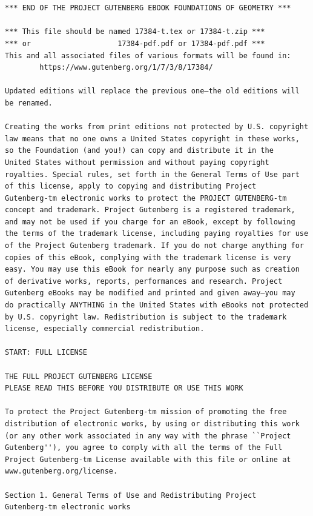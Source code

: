 \documentclass[11pt,oneside]{book}
\begin{document}
\newpage

\small
{}
\begin{verbatim}


*** END OF THE PROJECT GUTENBERG EBOOK FOUNDATIONS OF GEOMETRY ***

*** This file should be named 17384-t.tex or 17384-t.zip ***
*** or                    17384-pdf.pdf or 17384-pdf.pdf ***
This and all associated files of various formats will be found in:
        https://www.gutenberg.org/1/7/3/8/17384/

Updated editions will replace the previous one—the old editions will
be renamed.

Creating the works from print editions not protected by U.S. copyright
law means that no one owns a United States copyright in these works,
so the Foundation (and you!) can copy and distribute it in the
United States without permission and without paying copyright
royalties. Special rules, set forth in the General Terms of Use part
of this license, apply to copying and distributing Project
Gutenberg-tm electronic works to protect the PROJECT GUTENBERG-tm
concept and trademark. Project Gutenberg is a registered trademark,
and may not be used if you charge for an eBook, except by following
the terms of the trademark license, including paying royalties for use
of the Project Gutenberg trademark. If you do not charge anything for
copies of this eBook, complying with the trademark license is very
easy. You may use this eBook for nearly any purpose such as creation
of derivative works, reports, performances and research. Project
Gutenberg eBooks may be modified and printed and given away—you may
do practically ANYTHING in the United States with eBooks not protected
by U.S. copyright law. Redistribution is subject to the trademark
license, especially commercial redistribution.

START: FULL LICENSE

THE FULL PROJECT GUTENBERG LICENSE
PLEASE READ THIS BEFORE YOU DISTRIBUTE OR USE THIS WORK

To protect the Project Gutenberg-tm mission of promoting the free
distribution of electronic works, by using or distributing this work
(or any other work associated in any way with the phrase ``Project
Gutenberg''), you agree to comply with all the terms of the Full
Project Gutenberg-tm License available with this file or online at
www.gutenberg.org/license.

Section 1. General Terms of Use and Redistributing Project
Gutenberg-tm electronic works


\end{verbatim}
\end{document}
